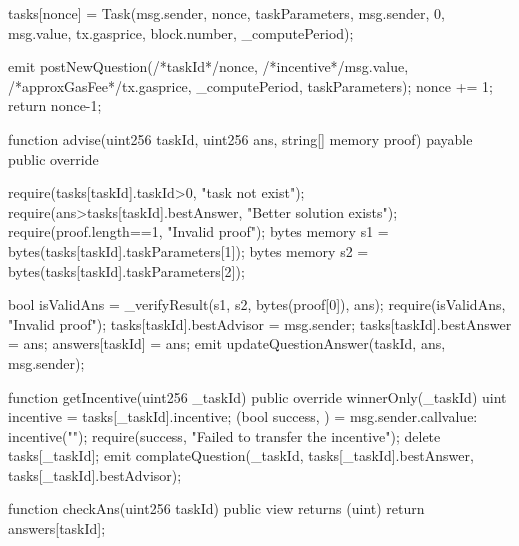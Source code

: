 \begin{solidity}
{{        tasks[nonce] = Task(msg.sender, nonce, taskParameters, msg.sender, 0,  msg.value, tx.gasprice, block.number, _computePeriod);
        
        emit postNewQuestion(/*taskId*/nonce, /*incentive*/msg.value, /*approxGasFee*/tx.gasprice, _computePeriod, taskParameters);
        nonce += 1;
        return nonce-1;
    }



    function advise(uint256 taskId, uint256 ans, string[] memory proof) payable public override {
        require(tasks[taskId].taskId>0, "task not exist");
        require(ans>tasks[taskId].bestAnswer, "Better solution exists");
        require(proof.length==1, "Invalid proof");
        bytes memory s1 = bytes(tasks[taskId].taskParameters[1]);
        bytes memory s2 = bytes(tasks[taskId].taskParameters[2]);
        
        bool isValidAns = _verifyResult(s1, s2, bytes(proof[0]), ans);
        require(isValidAns, "Invalid proof");
        tasks[taskId].bestAdvisor = msg.sender;
        tasks[taskId].bestAnswer = ans;
        answers[taskId] = ans;
        emit updateQuestionAnswer(taskId, ans, msg.sender);

    }

    function getIncentive(uint256 _taskId) public override winnerOnly(_taskId) {
        uint incentive = tasks[_taskId].incentive;
        (bool success, )  = msg.sender.call{value: incentive}(""); 
        require(success, "Failed to transfer the incentive");
        delete tasks[_taskId];
        emit complateQuestion(_taskId, tasks[_taskId].bestAnswer, tasks[_taskId].bestAdvisor);
    }

    function checkAns(uint256 taskId) public view returns (uint) {
        return answers[taskId];
    }


}

\end{solidity}